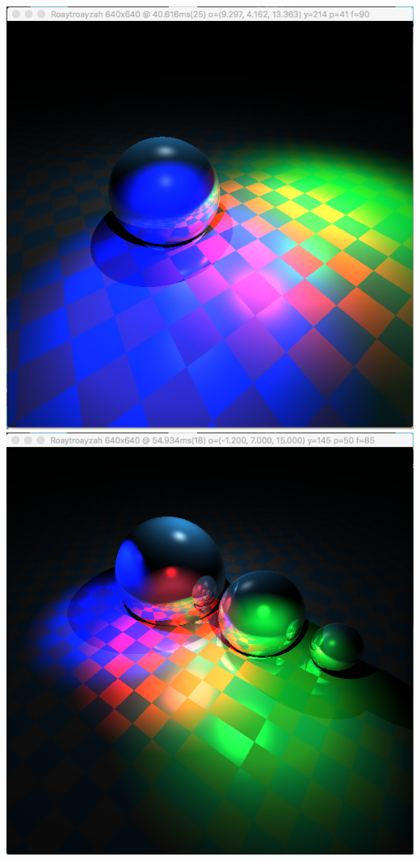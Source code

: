 \includegraphics[width=\textwidth]{img/colSpotlights1sphere}
\includegraphics[width=\textwidth]{img/colSpotlights3spheres}
